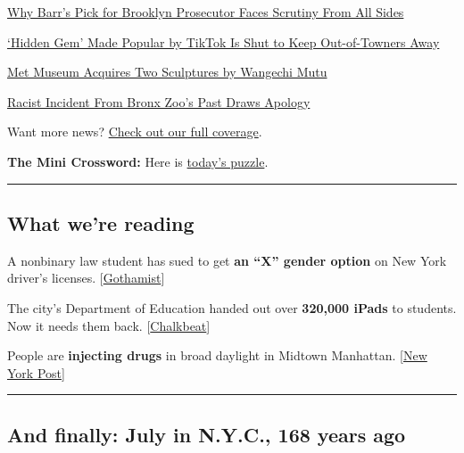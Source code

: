 \href{https://www.nytimes3xbfgragh.onion/2020/07/30/nyregion/seth-ducharme-us-attorney-brooklyn.html}{Why
Barr's Pick for Brooklyn Prosecutor Faces Scrutiny From All Sides}

\href{https://www.nytimes3xbfgragh.onion/2020/07/29/nyregion/lake-solitude-closed-racism.html}{`Hidden
Gem' Made Popular by TikTok Is Shut to Keep Out-of-Towners Away}

\href{https://www.nytimes3xbfgragh.onion/2020/07/28/arts/design/met-museum-wangechi-mutu.html}{Met
Museum Acquires Two Sculptures by Wangechi Mutu}

\href{https://www.nytimes3xbfgragh.onion/2020/07/29/arts/bronx-zoo-apology-racism.html}{Racist
Incident From Bronx Zoo's Past Draws Apology}

Want more news?
\href{https://www.nytimes3xbfgragh.onion/section/nyregion}{Check out our
full coverage}.

\textbf{The Mini Crossword:} Here is
\href{https://www.nytimes3xbfgragh.onion/crosswords/game/mini}{today's
puzzle}.

\begin{center}\rule{0.5\linewidth}{\linethickness}\end{center}

\hypertarget{what-were-reading}{%
\subsection{What we're reading}\label{what-were-reading}}

A nonbinary law student has sued to get \textbf{an ``X'' gender option}
on New York driver's licenses.
{[}\href{https://gothamist.com/news/nonbinary-nyu-law-student-sues-get-x-gender-option-ny-drivers-licenses}{Gothamist}{]}

The city's Department of Education handed out over \textbf{320,000
iPads} to students. Now it needs them back.
{[}\href{https://ny.chalkbeat.org/2020/7/29/21347043/remote-learning-devices-distribution-nyc}{Chalkbeat}{]}

People are \textbf{injecting drugs} in broad daylight in Midtown
Manhattan.
{[}\href{https://nypost.com/2020/07/28/apparent-junkies-turn-part-of-nycs-midtown-into-shooting-gallery/}{New
York Post}{]}

\begin{center}\rule{0.5\linewidth}{\linethickness}\end{center}

\hypertarget{and-finally-july-in-nyc-168-years-ago}{%
\subsection{And finally: July in N.Y.C., 168 years
ago}\label{and-finally-july-in-nyc-168-years-ago}}

